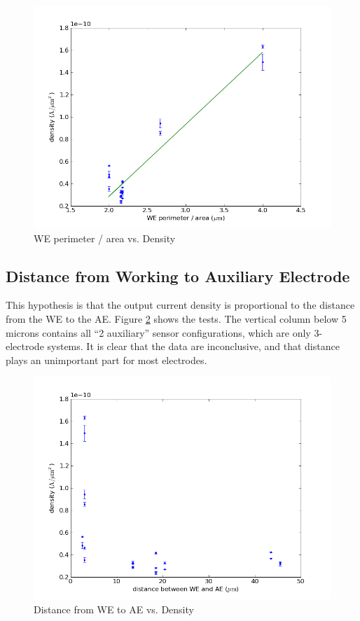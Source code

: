\begin{figure}
	\centering
	\includegraphics[width=0.7\linewidth]{figures/perim_area_v_density.png}
	\caption{WE perimeter / area vs. Density}
	\label{perim_area_v_density}
\end{figure}

\subsection{Distance from Working to Auxiliary Electrode}

This hypothesis is that the output current density is proportional to the distance from the WE to the AE. Figure \ref{distance_v_density} shows the tests. The vertical column below 5 microns contains all ``2 auxiliary'' sensor configurations, which are only 3-electrode systems. It is clear that the data are inconclusive, and that distance plays an unimportant part for most electrodes.

\begin{figure}
	\centering
	\includegraphics[width=0.7\linewidth]{figures/distance_v_density.png}
	\caption{Distance from WE to AE vs. Density}
	\label{distance_v_density}
\end{figure}

